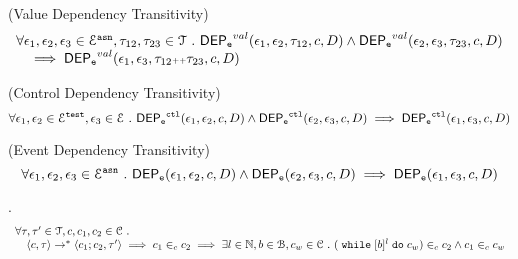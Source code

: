 %
\begin{thm}
	\label{lem:valdep_trans}
(Value Dependency Transitivity)
  \[
	  \begin{array}{l}
  \forall \mathtt{\epsilon}_1, \mathtt{\epsilon}_2, \mathtt{\epsilon}_3 \in \mathcal{E}^{\mathtt{{asn}}}, \mathtt{\tau}_{12}, \mathtt{\tau}_{23} \in \mathcal{T} ~.~ 
  \mathsf{DEP_{\mathtt{e}}}^{val}(\mathtt{\epsilon}_1, \mathtt{\epsilon}_2, \mathtt{\tau}_{12}, c, D) 
  \land
  \mathsf{DEP_{\mathtt{e}}}^{val}(\mathtt{\epsilon}_2, \mathtt{\epsilon}_3, \mathtt{\tau}_{23}, c, D) 
  \\ \quad
  \implies
  \mathsf{DEP_{\mathtt{e}}}^{val}(\mathtt{\epsilon}_1, \mathtt{\epsilon}_3, \mathtt{\tau}_{12}{\scriptscriptstyle ++}\mathtt{\tau}_{23}, c, D)
	  \end{array}
  \]
\end{thm}
%
%
\begin{lem}(Control Dependency Transitivity)
\label{lem:ctl_trans}
\[
  \forall \mathtt{\epsilon}_1, \mathtt{\epsilon}_2 \in \mathcal{E}^{\mathtt{{test}}}, \mathtt{\epsilon}_3 \in \mathcal{E} ~.~
  \mathsf{DEP_{\mathtt{e}}}^{\mathtt{{ctl}}}(\mathtt{\epsilon}_1, \mathtt{\epsilon}_2, c, D) 
  \land \mathsf{DEP_{\mathtt{e}}}^{\mathtt{{ctl}}}(\mathtt{\epsilon}_2, \mathtt{\epsilon}_3, c, D)
  \implies \mathsf{DEP_{\mathtt{e}}}^{\mathtt{{ctl}}}(\mathtt{\epsilon}_1, \mathtt{\epsilon}_3, c, D)
\]
\end{lem}
%
\begin{lem}
	\label{lem:eventdep_trans}
(Event Dependency Transitivity)
	\[
	\forall \mathtt{\epsilon}_1, \mathtt{\epsilon}_2, \mathtt{\epsilon}_3 \in \mathcal{E}^{\mathtt{{asn}}}~.~ 
	\mathsf{DEP_{\mathtt{e}}}(\mathtt{\epsilon}_1, \mathtt{\epsilon}_2, c, D) 
	\land
	\mathsf{DEP_{\mathtt{e}}}(\mathtt{\epsilon}_2, \mathtt{\epsilon}_3, c, D) 
	\implies
	\mathsf{DEP_{\mathtt{e}}}(\mathtt{\epsilon}_1, \mathtt{\epsilon}_3, c, D)
	\]
  \end{lem}
%
\begin{lem}.
\label{lem:inv_while}
\[
\begin{array}{l}
\forall \mathtt{\tau}, \mathtt{\tau}' \in \mathcal{T}, c, c_1, c_2 \in \mathcal{C} ~.~
	\\ \quad
	\langle c, \mathtt{\tau} \rangle \rightarrow^* \langle c_1; c_2, \mathtt{\tau}' \rangle
	\implies
	c_1 \in_c c_2
	\implies
	\exists l \in \mathbb{N}, b \in \mathcal{B}, c_w \in \mathcal{C} ~.~ 
	(\;\mathtt{while}\; [b]^l \;\mathtt{do}\; c_w) \in_c c_2 \land c_1 \in_c c_w
\end{array}
\]
\end{lem}
%

